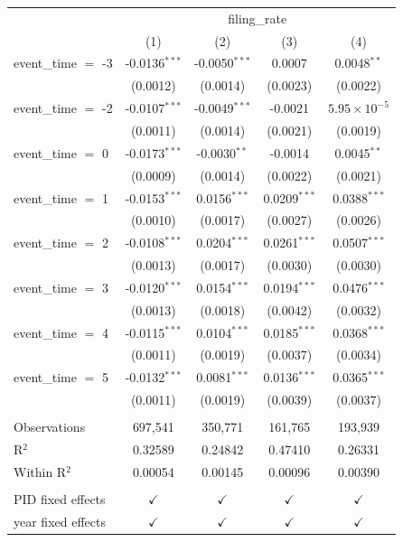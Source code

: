 
\begingroup
\centering
\begin{tabular}{lcccc}
   \toprule
    & \multicolumn{4}{c}{filing\_rate}\\
                       & (1)             & (2)             & (3)            & (4)\\  
   \midrule 
   event\_time $=$ -3  & -0.0136$^{***}$ & -0.0050$^{***}$ & 0.0007         & 0.0048$^{**}$\\   
                       & (0.0012)        & (0.0014)        & (0.0023)       & (0.0022)\\   
   event\_time $=$ -2  & -0.0107$^{***}$ & -0.0049$^{***}$ & -0.0021        & $5.95\times 10^{-5}$\\    
                       & (0.0011)        & (0.0014)        & (0.0021)       & (0.0019)\\   
   event\_time $=$ 0   & -0.0173$^{***}$ & -0.0030$^{**}$  & -0.0014        & 0.0045$^{**}$\\   
                       & (0.0009)        & (0.0014)        & (0.0022)       & (0.0021)\\   
   event\_time $=$ 1   & -0.0153$^{***}$ & 0.0156$^{***}$  & 0.0209$^{***}$ & 0.0388$^{***}$\\   
                       & (0.0010)        & (0.0017)        & (0.0027)       & (0.0026)\\   
   event\_time $=$ 2   & -0.0108$^{***}$ & 0.0204$^{***}$  & 0.0261$^{***}$ & 0.0507$^{***}$\\   
                       & (0.0013)        & (0.0017)        & (0.0030)       & (0.0030)\\   
   event\_time $=$ 3   & -0.0120$^{***}$ & 0.0154$^{***}$  & 0.0194$^{***}$ & 0.0476$^{***}$\\   
                       & (0.0013)        & (0.0018)        & (0.0042)       & (0.0032)\\   
   event\_time $=$ 4   & -0.0115$^{***}$ & 0.0104$^{***}$  & 0.0185$^{***}$ & 0.0368$^{***}$\\   
                       & (0.0011)        & (0.0019)        & (0.0037)       & (0.0034)\\   
   event\_time $=$ 5   & -0.0132$^{***}$ & 0.0081$^{***}$  & 0.0136$^{***}$ & 0.0365$^{***}$\\   
                       & (0.0011)        & (0.0019)        & (0.0039)       & (0.0037)\\   
    \\
   Observations        & 697,541         & 350,771         & 161,765        & 193,939\\  
   R$^2$               & 0.32589         & 0.24842         & 0.47410        & 0.26331\\  
   Within R$^2$        & 0.00054         & 0.00145         & 0.00096        & 0.00390\\  
    \\
   PID fixed effects   & $\checkmark$    & $\checkmark$    & $\checkmark$   & $\checkmark$\\   
   year fixed effects  & $\checkmark$    & $\checkmark$    & $\checkmark$   & $\checkmark$\\   
   \bottomrule
\end{tabular}
\par\endgroup


